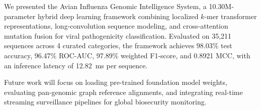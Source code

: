 \documentclass[conference]{IEEEtran}
\begin{document}
We presented the Avian Influenza Genomic Intelligence System, a 10.30M-parameter hybrid deep learning framework combining localized $k$-mer transformer representations, long-convolution sequence modeling, and cross-attention mutation fusion for viral pathogenicity classification. Evaluated on 35,211 sequences across 4 curated categories, the framework achieves 98.03\% test accuracy, 96.47\% ROC-AUC, 97.89\% weighted F1-score, and 0.8921 MCC, with an inference latency of 12.82~ms per sequence.

Future work will focus on loading pre-trained foundation model weights, evaluating pan-genomic graph reference alignments, and integrating real-time streaming surveillance pipelines for global biosecurity monitoring.



\end{document}
